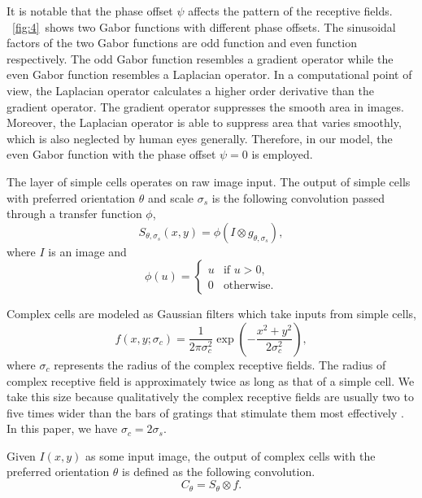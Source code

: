\documentclass[10pt]{article}
\begin{document}
It is notable that the phase offset $\psi$ affects the pattern of the receptive fields.
\figurename~\ref{fig:4}~shows two Gabor functions with different phase offsets.
The sinusoidal factors of the two Gabor functions are odd function and even function respectively.
The odd Gabor function resembles a gradient operator while the even Gabor function resembles a Laplacian operator.
In a computational point of view, the Laplacian operator calculates a higher order derivative than the gradient operator.
The gradient operator suppresses the smooth area in images.
Moreover, the Laplacian operator is able to suppress area that varies smoothly, which is also neglected by human eyes generally.
Therefore, in our model, the even Gabor function with the phase offset $\psi=0$ is employed.

The layer of simple cells operates on raw image input. 
The output of simple cells with preferred orientation $\theta$ and scale $\sigma_s$ is the following convolution passed through a transfer function $\phi$,
\begin{equation}\label{equ:gabor}
S_{\theta,\sigma_s}(x,y)=\phi(I\otimes g_{\theta,\sigma_s}),
\end{equation}
where $I$ is an image and 
\begin{equation}\label{equ:gabor}
\phi(u)=\left\{\begin{array}{ll}
u & \text{if } u>0,\\
0 & \text{otherwise.}
\end{array}\right.
\end{equation}

Complex cells are modeled as Gaussian filters which take inputs from simple cells,
\begin{equation}
f(x,y;\sigma_c)=\frac{1}{2\pi\sigma_c^2}\exp\left(-\frac{x^2+y^2}{2\sigma_c^2}\right),
\end{equation}
where $\sigma_c$ represents the radius of the complex receptive fields.
The radius of complex receptive field is approximately twice as long as that of a simple cell.
We take this size because qualitatively the complex receptive fields are usually two to five times wider 
than the bars of gratings that stimulate them most effectively \cite{hubel1962}.
In this paper, we have $\sigma_c=2\sigma_s$.

Given $I(x,y)$ as some input image, the output of complex cells
with the preferred orientation $\theta$ is defined as the following convolution.
\begin{equation}
C_{\theta}=S_{\theta}\otimes f.
\label{equ:complex}
\end{equation}
\end{document}
